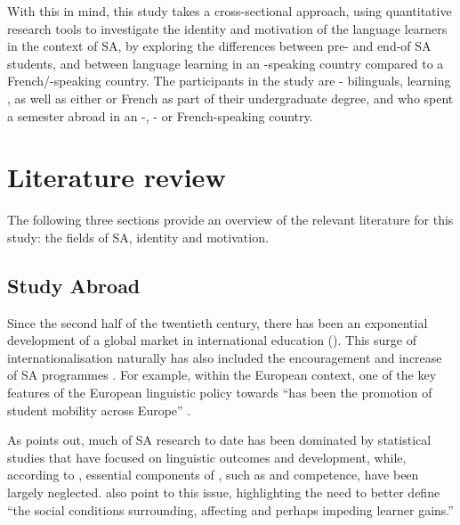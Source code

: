 \documentclass[output=paper]{langsci/langscibook}
\begin{document}
With this in mind, this study takes a cross-sectional approach, using quantitative research tools to investigate the identity and motivation of the language learners in the context of SA, by exploring the differences between pre- and end-of SA students, and between language learning in an -speaking country compared to a French/-speaking country. The participants in the study are - bilinguals, learning , as well as either  or French as part of their undergraduate degree, and who spent a semester abroad in an -, - or French-speaking country.


\section{Literature review}

The following three sections provide an overview of the relevant literature for this study: the fields of SA, identity and motivation.

\subsection{Study Abroad}


Since the second half of the twentieth century, there has been an exponential development of a global market in international education (\citealt{MazzarolEtAl2003}). This surge of internationalisation naturally has also included the encouragement and increase of SA programmes \citep{Jackson2008a}. For example, within the European context, one of the key features of the European {linguistic} policy towards  “has been the promotion of student mobility across Europe” \citep[103]{Pérez-Vidal2011}.

As \citet{Jackson2008b} points out, much of SA research to date has been dominated by statistical studies that have focused on {linguistic} outcomes and  development, while, according to \citet{Coleman1998}, essential components of , such as  and  competence, have been largely neglected. \citet[165]{CollentineFreed2004intro} also point to this issue, highlighting the need to better define “the social conditions surrounding, affecting and perhaps impeding learner gains.”
\end{document}
